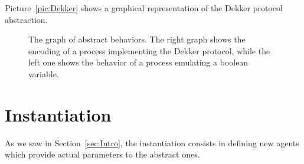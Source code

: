 \documentclass[10pt,a4paper]{article}
\begin{document}
            Picture~\ref{pic:Dekker} shows a graphical representation of the
            Dekker protocol abstraction.

    \begin{figure}[htbp]
        \centering
        \label{pic:Protocol}
        \caption{
            The graph of abstract behaviors. The right graph shows the
            encoding of a process implementing the Dekker protocol, while
            the left one shows the behavior of a process emulating a
            boolean variable.
        }
    \end{figure}

\section{Instantiation}
\label{sec:Instantiation}

    As we saw in Section~\ref{sec:Intro}, the instantiation consists in
    defining new agents which provide actual parameters to the abstract
    ones.
\end{document}
